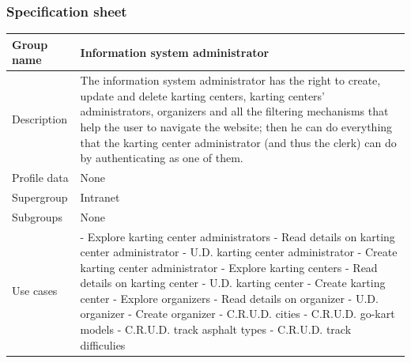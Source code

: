 \documentclass{beamer}
\begin{document}
\begin{frame}
    \frametitle{Specification sheet}
    \begin{table}
        \tiny
        \begin{tabular}{|p{2cm}|p{6cm}|}
        \hline
        Group name & \textbf{Information system administrator} \\
        \hline
        Description & The information system administrator has the right to create, update and delete karting centers,
        karting centers' administrators, organizers and all the filtering mechanisms that help the user to navigate the website;
        then he can do everything that the karting center administrator (and thus the clerk) can do by authenticating as one of them. \\
        \hline
        Profile data & None \\
        \hline
        Supergroup & Intranet \\
        \hline
        Subgroups & None \\
        \hline
        Use cases & 
        - Explore karting center administrators \newline
        - Read details on karting center administrator \newline
        - U.D. karting center administrator \newline
        - Create karting center administrator \newline
        - Explore karting centers \newline
        - Read details on karting center \newline
        - U.D. karting center \newline
        - Create karting center \newline
        - Explore organizers \newline
        - Read details on organizer \newline
        - U.D. organizer \newline
        - Create organizer \newline
        - C.R.U.D. cities \newline
        - C.R.U.D. go-kart models \newline
        - C.R.U.D. track asphalt types \newline
        - C.R.U.D. track difficulies \\
        \hline
        \end{tabular}
    \end{table}
\end{frame}
\end{document}

